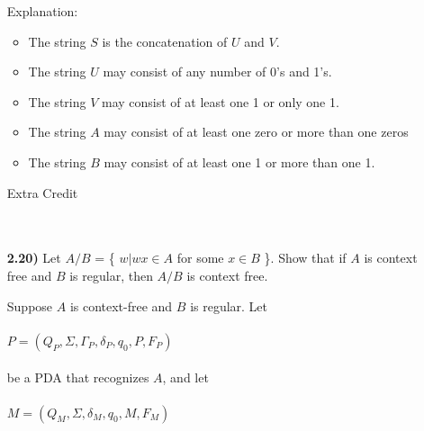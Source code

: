 \documentclass[12pt]{letter}
\newcommand\tab[1][2cm]{\hspace*{#1}}
\begin{document}
\begin{enumerate}
Explanation:\\
	\begin{itemize}
		\item The string $S$ is the concatenation of $U$ and $V$.
		\item The string $U$ may consist of any number of 0's and 1's.
		\item The string $V$ may consist of at least one 1 or only one 1.
		\item The string $A$ may consist of at least one zero or more than one zeros
		\item The string $B$ may consist of at least one 1 or more than one 1.
	\end{itemize}

\newpage
\tab \tab \tab Extra Credit \\
\leavevmode \\
\leavevmode \\

\item[\textbf{2.20)}] Let $A/B$ = \{ $w| wx \in A$ for some $x \in B$ \}. Show that if $A$ is context free and $B$ is regular, then $A/B$ is context free.

Suppose $A$ is context-free and $B$ is regular. Let \\
\leavevmode \\
	\tab \tab $P = (Q_P , \Sigma, \Gamma_P , \delta_P , q_0,P , F_P)$ \\
\leavevmode \\
	\tab \tab be a PDA that recognizes $A$, and let \\
\leavevmode \\
	\tab \tab $M = (Q_M, \Sigma, \delta_M, q_0,M, F_M)$ \\


\end{enumerate}
\end{document}

